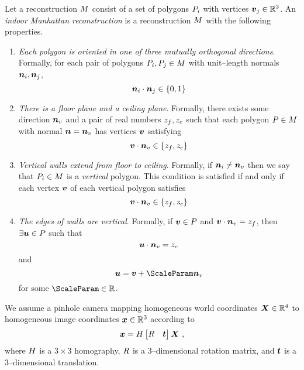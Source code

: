 Let a reconstruction $\Reconstruction$ consist of a set of polygons
$\Poly_i$ with vertices $\vertex_j\in\Rthree$. An \textit{indoor
  Manhattan reconstruction} is a reconstruction $\Reconstruction$ with
the following properties.
\begin{enumerate}
\item{\textit{Each polygon is oriented in one of three mutually
    orthogonal directions}. Formally, for each pair of polygons
  $\Poly_i,\Poly_j \in \Reconstruction$ with unit--length normals
  $\normal_i,\normal_j$,
  \begin{equation}
    \normal_i \cdot \normal_j \in \{0,1\}
  \end{equation}
}
\item{\textit{There is a floor plane and a ceiling plane}. Formally,
  there exists some direction $\vertnormal$ and a pair of real
  numbers $\zfloor, \zceil$ such that each polygon
  $P\in\Reconstruction$ with normal $\normal=\vertnormal$ has
  vertices $\vertex$ satisfying
  \begin{equation}
    \vertex \cdot \vertnormal \in \{\zfloor, \zceil\}
  \end{equation}
}
\item{\textit{Vertical walls extend from floor to ceiling}. Formally, if
  $\normal_i \neq \vertnormal$ then we say that $\Poly_i \in
  \Reconstruction$ is a \textit{vertical} polygon. This
  condition is satisfied if and only if each vertex $\vertex$ of
  each vertical polygon satisfies
  \begin{equation}
    \vertex \cdot \vertnormal \in \{\zfloor, \zceil\}
  \end{equation}
}
\item{\textit{The edges of walls are vertical}. Formally, if
  $\vertex\in\Poly$ and $\vertex\cdot\vertnormal=\zfloor$, then
  $\exists\othervertex\in\Poly$ such that
  \begin{equation}
    \othervertex \cdot \vertnormal = \zceil
  \end{equation}
  and
  \begin{equation}
    \othervertex = \vertex + \ScaleParam \vertnormal
  \end{equation}
  for some $\ScaleParam \in \Reals$.
}
\end{enumerate}

We assume a pinhole camera mapping homogeneous world coordinates
$\vect{X}\in\Rfour$ to homogeneous image coordinates $\vect{x}\in\Rthree$
according to
\begin{equation}
  \vect{x} = 
  \CamMatrix \begin{bmatrix} \CamR & \CamTr \end{bmatrix} \vect{X} ~,
\end{equation}
where $\CamMatrix$ is a $3 \times 3$ homography, $\CamR$ is a
3--dimensional rotation matrix, and $\CamTr$ is a 3--dimensional
translation.

